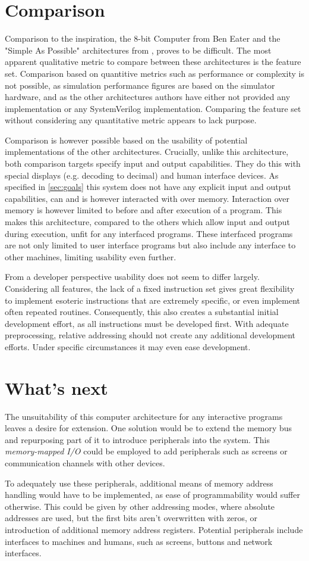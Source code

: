 \section{Comparison}
Comparison to the inspiration, the 8-bit Computer from Ben Eater \cite{beneater} and the "Simple As Possible" architectures from \cite{malvino1983a}, proves to be difficult. The most apparent qualitative metric to compare between these architectures is the feature set. Comparison based on quantitive metrics such as performance or complexity is not possible, as simulation performance figures are based on the simulator hardware, and as the other architectures authors have either not provided any implementation or any SystemVerilog implementation. Comparing the feature set without considering any quantitative metric appears to lack purpose.

Comparison is however possible based on the usability of potential implementations of the other architectures. Crucially, unlike this architecture, both comparison targets specify input and output capabilities. They do this with special displays (e.g. decoding to decimal) and human interface devices. As specified in \ref{sec:goals} this system does not have any explicit input and output capabilities, can and is however interacted with over memory. Interaction over memory is however limited to before and after execution of a program. This makes this architecture, compared to the others which allow input and output during execution, unfit for any interfaced programs. These interfaced programs are not only limited to user interface programs but also include any interface to other machines, limiting usability even further.

From a developer perspective usability does not seem to differ largely. Considering all features, the lack of a fixed instruction set gives great flexibility to implement esoteric instructions that are extremely specific, or even implement often repeated routines. Consequently, this also creates a substantial initial development effort, as all instructions must be developed first. With adequate preprocessing, relative addressing should not create any additional development efforts. Under specific circumstances it may even ease development.

\section{What's next}
The unsuitability of this computer architecture for any interactive programs leaves a desire for extension. One solution would be to extend the memory bus and repurposing part of it to introduce peripherals into the system. This \textit{memory-mapped I/O} could be employed to add peripherals such as screens or communication channels with other devices. 

To adequately use these peripherals, additional means of memory address handling would have to be implemented, as ease of programmability would suffer otherwise. This could be given by other addressing modes, where absolute addresses are used, but the first bits aren't overwritten with zeros, or introduction of additional memory address registers. Potential peripherals include interfaces to machines and humans, such as screens, buttons and network interfaces.

